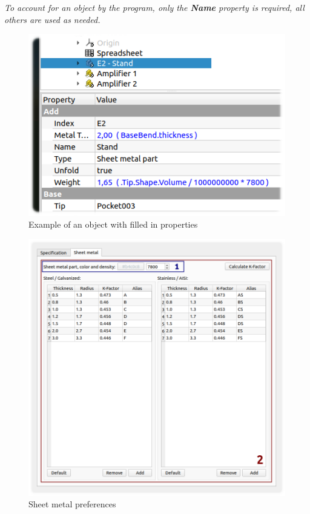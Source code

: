 \documentclass[a4paper,12pt]{article}
\begin{document}
\begin{center}\emph{To account for an object by the program, only the \textbf{Name} property is required, all others are used as needed.}\end{center}

\begin{figure}[htp]
\centering
\includegraphics[scale=0.8]{img/properties.png}
\caption{Example of an object with filled in properties}
\label{sec:properties}
\end{figure}

\pagebreak

\begin{figure}[htp]
\centering
\includegraphics[width=1.0\textwidth]{img/pref_sm.png}
\caption{Sheet metal preferences}
\label{sec:pref_sm}
\end{figure}
\end{document}
